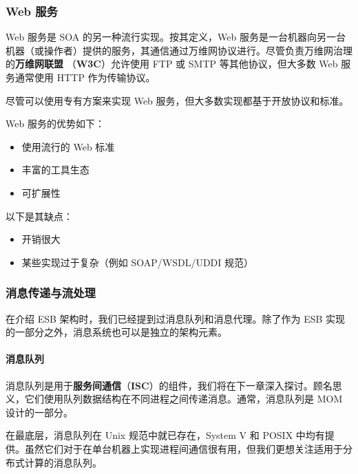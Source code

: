 \subsubsection{Web 服务}

\label{idx:1336}
\label{idx:1337}
\label{idx:1338}
Web 服务是 SOA 的另一种流行实现。按其定义，Web 服务是一台机器向另一台机器（或操作者）提供的服务，其通信通过万维网协议进行。尽管负责万维网治理的\textbf{万维网联盟 }（\textbf{W3C}）允许使用 FTP 或 SMTP 等其他协议，但大多数 Web 服务通常使用 HTTP 作为传输协议。

尽管可以使用专有方案来实现 Web 服务，但大多数实现都基于开放协议和标准。

\label{idx:1339}
Web 服务的优势如下：

\begin{itemize}
\item 使用流行的 Web 标准
\label{idx:1340}
\item 丰富的工具生态
\item 可扩展性
\end{itemize}

\label{idx:1341}
以下是其缺点：

\begin{itemize}
\item 开销很大
\label{idx:1342}
\item 某些实现过于复杂（例如 SOAP/WSDL/UDDI 规范）
\end{itemize}

\subsubsection{消息传递与流处理}

在介绍 ESB 架构时，我们已经提到过消息队列和消息代理。除了作为 ESB 实现的一部分之外，消息系统也可以是独立的架构元素。

\paragraph{消息队列}

\label{idx:1343}
\label{idx:1344}
\label{idx:1345}
消息队列是用于\textbf{服务间通信}（\textbf{ISC}）的组件，我们将在下一章深入探讨。顾名思义，它们使用队列数据结构在不同进程之间传递消息。通常，消息队列是 MOM 设计的一部分。


在最底层，消息队列在 Unix 规范中就已存在，System V 和 POSIX 中均有提供。虽然它们对于在单台机器上实现进程间通信很有用，但我们更想关注适用于分布式计算的消息队列。

